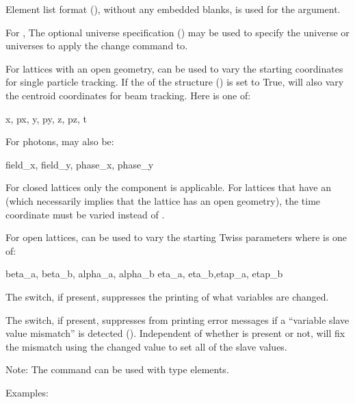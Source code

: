Element list format (), without any embedded blanks, is used for
the  argument.

For , The optional  universe specification
() may be used to specify the universe or universes to apply the change
command to.

For lattices with an open geometry,  can be used to
vary the starting coordinates for single particle tracking. If the
 of the  structure () is set to
True,  will also vary the centroid coordinates for beam tracking. Here
 is one of:
\begin{example}
  x, px, y, py, z, pz, t
\end{example}
For photons,  may also be:
\begin{example}
  field_x, field_y, phase_x, phase_y
\end{example}
For closed lattices only the  component is applicable. For lattices that have an
 (which necessarily implies that the lattice has an open geometry), the time
 coordinate must be varied instead of .

For open lattices,  can be used to vary the starting
Twiss parameters where  is one of:
\begin{example}
  beta_a, beta_b, alpha_a, alpha_b 
  eta_a, eta_b,etap_a, etap_b    
\end{example}

The  switch, if present, suppresses the printing of what variables are
changed.

The  switch, if present, suppresses \tao from printing error messages if a ``variable
slave value mismatch'' is detected (). Independent of whether  is
present or not, \tao will fix the mismatch using the changed value to set all of the slave values.

Note: The  command can be used with  type elements.

Examples:


